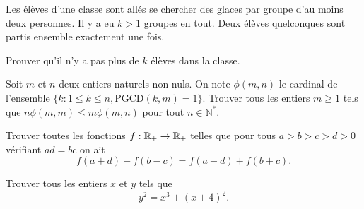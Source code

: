 \begin{exo}{}
Les \'el\`eves d'une classe sont all\'es se chercher des glaces par groupe d'au moins deux personnes. Il y a eu $k>1$ groupes en tout. Deux élèves quelconques sont partis ensemble exactement une fois.

 Prouver qu'il n'y a pas plus de $k$ \'el\`eves dans la classe.
\end{exo}

\begin{exo}{}Soit $m$ et $n$ deux entiers naturels non nuls. On note $\phi(m,n)$ le
cardinal de l'ensemble $\{k : 1 \leq k \leq n, \mathrm{PGCD}(k,m) =
1\}$. Trouver tous les entiers $m \geq 1$ tels que $n \phi(m,m) \leq m
\phi(m,n)$ pour tout $n \in \mathbb{N}^\ast$.
\end{exo}


\begin{exo}{}
Trouver toutes les fonctions $f : \mathbb R_{+} \rightarrow \mathbb R_{+}$ telles que pour tous $a>b>c>d>0$ vérifiant $ad=bc$ on ait
$$f(a+d)+f(b-c)=f(a-d)+f(b+c).$$

\end{exo}

\begin{exo}{}
Trouver tous les entiers $x$ et $y$ tels que \[y^2=x^3+(x+4)^2.\]
\end{exo}

